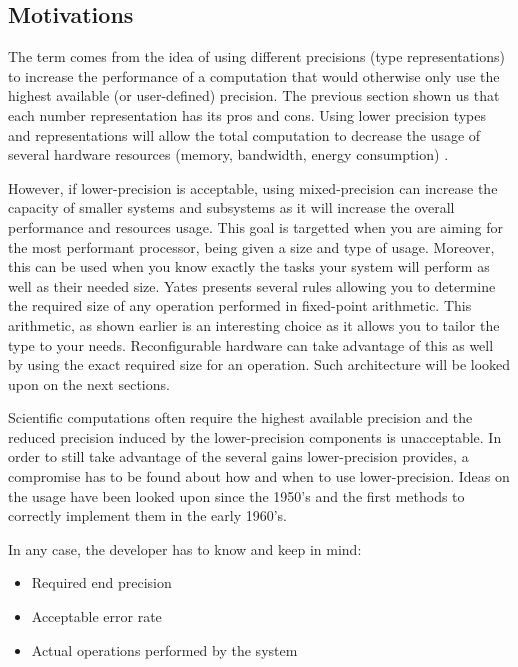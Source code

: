 \subsection{Motivations}

The term  comes from the idea of using different precisions (type representations) to increase the performance of a computation that would otherwise only use the highest available (or user-defined) precision. The previous section shown us that each number representation has its pros and cons. Using lower precision types and representations will allow the total computation to decrease the usage of several hardware resources (memory, bandwidth, energy consumption) \cite{Horowitz2014,Nips2015}.

However, if lower-precision is acceptable, using mixed-precision can increase the capacity of smaller systems and subsystems as it will increase the overall performance and resources usage. This goal is targetted when you are aiming for the most performant processor, being given a size and type of usage. Moreover, this can be used when you know exactly the tasks your system will perform as well as their needed size. Yates \cite{Yates2007} presents several rules allowing you to determine the required size of any operation performed in fixed-point arithmetic. This arithmetic, as shown earlier is an interesting choice as it allows you to tailor the type to your needs. Reconfigurable hardware can take advantage of this as well by using the exact required size for an operation. Such architecture will be looked upon on the next sections.

Scientific computations often require the highest available precision and the reduced precision induced by the lower-precision components is unacceptable. In order to still take advantage of the several gains lower-precision provides, a compromise has to be found about how and when to use lower-precision. Ideas on the usage have been looked upon since the 1950's and the first methods to correctly implement them in the early 1960's.

In any case, the developer has to know and keep in mind:
\begin{itemize}
  \item Required end precision
  \item Acceptable error rate
  \item Actual operations performed by the system
\end{itemize}

